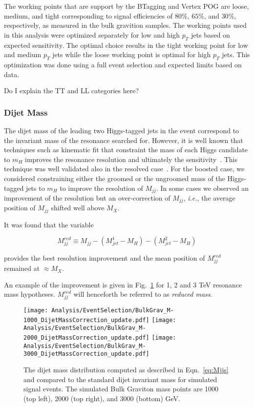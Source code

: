 The working points that are support by the BTagging and Vertex POG are loose, medium, and tight corresponding to signal efficiencies of $80\%$, $65\%$, and $30\%$, respectively, as measured in the bulk gravition samples. The working points used in this analysis were optimized separately for low and high $p_{T}$ jets based on expected sensitivity. The optimal choice results in the tight working point for low and medium $p_{T}$ jets while the loose working point is optimal for high $p_{T}$ jets. This optimization was done using a full event selection and expected limits based on data. 

Do I explain the TT and LL categories here?

\subsubsection{Dijet Mass}

The dijet mass of the leading two Higgs-tagged jets in the event correspond to the invariant mass of the resonance searched for. However, it is well known that techniques such as kinematic fit that constraint the mass of each Higgs candidate to $m_{H}$ improves the resonance resolution and ultimately the sensitivity~\cite{CMS-PAS-B2G-16-008}. This technique was well validated also in the resolved case~\cite{Khachatryan:2015year}. For the boosted case, we considered constraining either the groomed or the ungroomed mass of the Higgs-tagged jets to $m_{H}$ to improve the resolution of $M_{jj}$. In some cases we observed an improvement of the resolution but an over-correction of $M_{jj}$, \textit{i.e.}, the average position of $M_{jj}$ shifted well above $M_{X}$.

It was found that the variable

\begin{equation}
M_{jj}^{red} \equiv M_{jj} - (M_{jet}^{1}-M_{H}) - (M_{jet}^{2}-M_{H})
\label{eq:Mjjs}
\end{equation}

provides the best resolution improvement and the mean position of $M_{jj}^{red}$ remained at $\approx M_{X}$.

An example of the improvement is given in Fig.~\ref{fig:subtImp} for 1, 2 and 3 TeV resonance mass hypotheses. $M_{jj}^{red}$ will henceforth be referred to as \textit{reduced mass}.

\begin{figure}[H]
\begin{center}
\texttt{[image: Analysis/EventSelection/BulkGrav\_M-1000\_DijetMassCorrection\_update.pdf]}
\texttt{[image: Analysis/EventSelection/BulkGrav\_M-2000\_DijetMassCorrection\_update.pdf]}
\texttt{[image: Analysis/EventSelection/BulkGrav\_M-3000\_DijetMassCorrection\_update.pdf]}
\end{center}
\caption{The dijet mass distribution computed as described in Eqn.~\ref{eq:Mjjs} and compared to the standard dijet invariant mass for simulated signal events. The simulated Bulk Graviton mass points are 1000 (top left), 2000 (top right), and 3000 (bottom) GeV.}
\label{fig:subtImp}
\end{figure}

